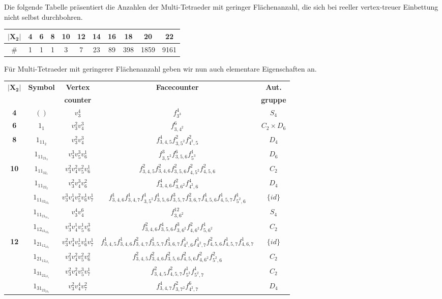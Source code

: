 \documentclass[12pt,titlepage,twoside,cleardoublepage]{article}
\theoremstyle{nummermitklammern}
\numberwithin{equation}{section}
\begin{document}
Die folgende Tabelle präsentiert die Anzahlen der Multi-Tetraeder mit geringer Flächenanzahl, die sich bei reeller vertex-treuer Einbettung nicht selbst durchbohren.  
\begin{center}
\begin{tabular}{|c|c|c|c|c|c|c|c|c|c|c|}
\hline
$\vert\textbf{X}_{\textbf{2}}\vert$&\textbf{4}&\textbf{6}&\textbf{8}&\textbf{10}&\textbf{12}&\textbf{14}&\textbf{16}&\textbf{18}&\textbf{20}&\textbf{22}\\
\hline
$\#$&1&1&1&3&7&23&89&398&1859&9161\\
\hline
\end{tabular}
\end{center}
Für Multi-Tetraeder mit geringerer Flächenanzahl geben wir nun auch elementare Eigenschaften an.

\begin{center}
\begin{tabular}[h]{|c|c|c|c|c|}
\hline
$\vert\textbf{X}_{\textbf{2}}\vert$ & \textbf{Symbol} & \textbf{Vertex}& \textbf{Facecounter} & \textbf{Aut.} \\
 &&\textbf{counter}&& \textbf{gruppe}\\
\hline
\textbf{4} & $()$ &$v_3^4$ & $f_{3^3}^4$ &$S_4$\\
\hline
\textbf{6} & $1_1$ & $v_3^2v_4^3$&$f^6_{3,4^2}$ &$C_2\times D_6$\\
\hline
\textbf{8} & $1_11_2$&$ v_3^2v_4^3$& $f^4_{3,4,5}f^2_{3,5^2}f^2_{4^2,5}$ & $D_4$\\
\hline  
  & $1_11_21_3$ & $v_3^3v_5^3v_6^1$& $f^3_{3,5^2}f^6_{3,5,6}f^1_{5^3}$ &$D_6$\\
\textbf{10}& $1_11_32_1$ &$v_3^2v_4^2v_5^2v_6^1$ & $f^2_{3,4,5}f^2_{3,4,6}f^2_{3,5,6}f^2_{4,5^2}f^2_{4,5,6}$ & $C_2$\\
  & $1_11_22_2$ &$v_3^2v_4^3v_6^2$& $f^4_{3,4,6}f^2_{3,6^2}f^4_{4^2,6}$ &$D_4$\\
\hline
  & $1_11_32_32_2$&$v_3^3v_4^1v_5^2v_6^1v_7^1$& $f^1_{3,4,6}f^1_{3,4,7}f^1_{3,5^2}f^1_{3,5,6}f^3_{3,5,7}f^2_{3,6,7}f^1_{4,5,6}f^1_{4,5,7}f^1_{5^2,6}$ &$\{id\}$\\
  & $1_11_21_31_4$& $v_3^4v_4^6$& $f^{12}_{3,6^2}$ &$S_4$\\
  & $1_12_41_32_2$&$v_3^3v_4^1v_5^1v_6^3$& $f^2_{3,4,6}f^4_{3,5,6}f^3_{3,6^2}f^2_{4,6^2}f^1_{5,6^2}$ & $C_2$\\
\textbf{12}& $1_21_12_43_2$&$v_3^2v_4^3v_5^1v_6^1v_7^1$& $f^1_{3,4,5}f^1_{3,4,6}f^2_{3,4,7}f^1_{3,5,7}f^1_{3,6,7}f^1_{4^2,6}f^1_{4^2,7}f^2_{4,5,6}f^1_{4,5,7}f^1_{4,6,7}$ &$\{id\}$\\
  & $1_21_12_43_3$& $v_3^2v_4^2v_5^2v_6^2$& $f^2_{3,4,5}f^2_{3,4,6}f^2_{3,5,6}f^2_{4,5,6}f^2_{4,6^2}f^2_{5^2,6}$&$C_2$\\
  & $1_31_22_43_4$& $v_3^2v_4^2v_5^3v_7^1$& $f^2_{3,4,5}f^2_{4,5,7}f^1_{5^3}f^1_{5^2,7}$&$C_2$\\
  & $1_31_22_23_3$& $v_3^2v_4^4v_7^2$&$f^4_{3,4,7}f^2_{3,7^2}f^6_{4^2,7}$ &$D_4$\\
 \hline
\end{tabular}
\end{center}
\end{document}
